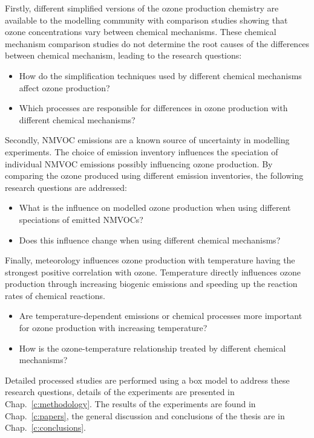 Firstly, different simplified versions of the ozone production chemistry are available to the modelling community with comparison studies showing that ozone concentrations vary between chemical mechanisms.
These chemical mechanism comparison studies do not determine the root causes of the differences between chemical mechanism, leading to the research questions:
\begin{itemize}
	\item How do the simplification techniques used by different chemical mechanisms affect ozone production? 
    \item Which processes are responsible for differences in ozone production with different chemical mechanisms?
\end{itemize}

Secondly, NMVOC emissions are a known source of uncertainty in modelling experiments.
The choice of emission inventory influences the speciation of individual NMVOC emissions possibly influencing ozone production.
By comparing the ozone produced using different emission inventories, the following research questions are addressed:
\begin{itemize}
	\item What is the influence on modelled ozone production when using different speciations of emitted NMVOCs? 
    \item Does this influence change when using different chemical mechanisms?
\end{itemize}

Finally, meteorology influences ozone production with temperature having the strongest positive correlation with ozone.
Temperature directly influences ozone production through increasing biogenic emissions and speeding up the reaction rates of chemical reactions.
\begin{itemize}
    \item Are temperature-dependent emissions or chemical processes more important for ozone production with increasing temperature? 
    \item How is the ozone-temperature relationship treated by different chemical mechanisms?
\end{itemize}

Detailed processed studies are performed using a box model to address these research questions, details of the experiments are presented in Chap.~\ref{c:methodology}.
The results of the experiments are found in Chap.~\ref{c:papers}, the general discussion and conclusions of the thesis are in Chap.~\ref{c:conclusions}.
